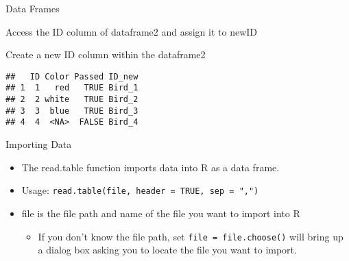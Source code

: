 \begin{frame}[fragile]{Data Frames}
\protect\hypertarget{data-frames-3}{}

Access the ID column of dataframe2 and assign it to newID

\begin{Shaded}
\begin{Highlighting}[]
\StringTok{ }\OperatorTok{$}
\end{Highlighting}
\end{Shaded}

Create a new ID column within the dataframe2

\begin{Shaded}
\begin{Highlighting}[]
\OperatorTok{$}\StringTok{ }\NormalTok{(}\OperatorTok{$} \NormalTok{)}
\end{Highlighting}
\end{Shaded}

\begin{verbatim}
##   ID Color Passed ID_new
## 1  1   red   TRUE Bird_1
## 2  2 white   TRUE Bird_2
## 3  3  blue   TRUE Bird_3
## 4  4  <NA>  FALSE Bird_4
\end{verbatim}

\end{frame}

\begin{frame}[fragile]{Importing Data}
\protect\hypertarget{importing-data}{}

\begin{itemize}
\tightlist
\item
  The read.table function imports data into R as a data frame.
\item
  Usage: \texttt{read.table(file,\ header\ =\ TRUE,\ sep\ =\ ",")}
\item
  file is the file path and name of the file you want to import into R

  \begin{itemize}
  \tightlist
  \item
    If you don't know the file path, set \texttt{file\ =\ file.choose()}
    will bring up a dialog box asking you to locate the file you want to
    import.
  \end{itemize}
\end{itemize}

\end{frame}

